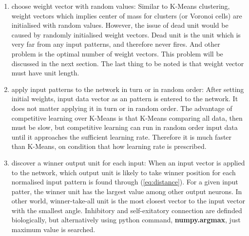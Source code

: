 \documentclass[12pt,a4paper]{report}
\begin{document}
\begin{enumerate}
\item {choose weight vector with random values}: \newline
Similar to K-Means clustering, weight vectors which implies center of mass for clusters (or Voronoi cells) are initialised with random values. However, the issue of dead unit would be caused by randomly initialised weight vectors. Dead unit is the unit which is very far from any input patterns, and therefore never fires. And other problem is the optimal number of weight vectors. This problem will be discussed in the next section. The last thing to be noted is that weight vector must have unit length.

\item apply input patterns to the network in turn or in random order: \newline
After setting initial weights, input data vector as an pattern is entered to the network. It does not matter applying it in turn or in random order. The advantage of competitive learning over K-Means is that K-Means comparing all data, then must be slow, but competitive learning can run in random order input data until it approaches the sufficient learning rate. Therefore it is much faster than K-Means, on condition that how learning rate is prescribed.

\item discover a winner output unit for each input: \newline
When an input vector is applied to the network, which output unit is likely to take winner position for each normalised input pattern is found through (\ref{eq:distance}). For a given input patter, the winner unit has the largest value among other output neurons. In other world, winner-take-all unit is the most closest vector to the input vector with the smallest angle. Inhibitory and self-exitatory connection are definded biologically, but alternatively using python command, \textbf{numpy.argmax}, just maximum value is searched.


\end{enumerate}
\end{document}
